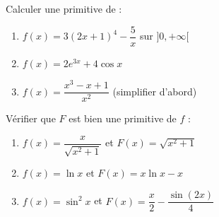 \begin{exercice}
  Calculer une primitive de :
  \begin{enumerate}
    \item $f(x) = 3(2x+1)^4 - \dfrac{5}{x}$ \quad sur $]0,+\infty[$
    \item $f(x) = 2e^{3x} + 4\cos x$
    \item $f(x) = \dfrac{x^3-x+1}{x^2}$ \quad (simplifier d'abord)
  \end{enumerate}
\end{exercice}

\begin{exercice}
  V\'{e}rifier que $F$ est bien une primitive de $f$ :
  \begin{enumerate}
    \item $f(x) = \dfrac{x}{\sqrt{x^2+1}}$ \quad et \quad $F(x) = \sqrt{x^2+1}$
    \item $f(x) = \ln x$ \quad et \quad $F(x) = x\ln x - x$
    \item $f(x) = \sin^2 x$ \quad et \quad $F(x) = \dfrac{x}{2} - \dfrac{\sin(2x)}{4}$
  \end{enumerate}
\end{exercice}